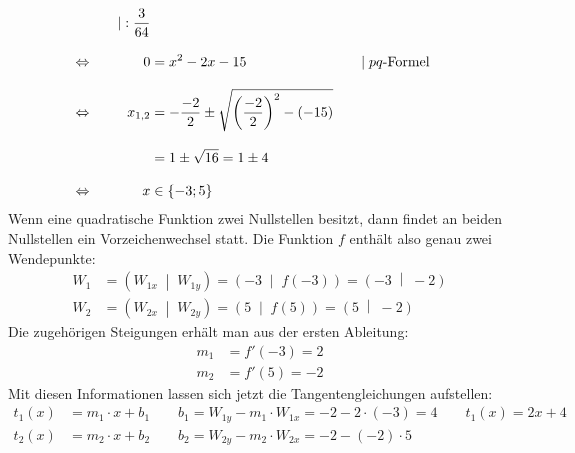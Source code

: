 \begin{exercise}
\begin{alignat*}{3}
      &
      \quad&|:\frac{3}{64}
      \\[2ex]
      \Leftrightarrow&\quad
      &
      0&=x^2-2x-15
      &
      \quad&|\;\text{$pq$-Formel}
      \\[2ex]
      \Leftrightarrow&\quad
      &
      x_{1,2}&=-\frac{-2}{2}\pm\sqrt{\left(\frac{-2}{2}\right)^2-(-15)}
      &
      \quad&\relax
      \\[2ex]
      \relax&\quad
      &
      &=1\pm\sqrt{16}=1\pm4
      &
      \quad&\relax
      \\[2ex]
      \Leftrightarrow&\quad
      &
      x&\in\{-3;5\}
      &
      \quad&\relax
    \end{alignat*}
    Wenn eine quadratische Funktion zwei
    Nullstellen besitzt, dann findet an beiden
    Nullstellen ein Vorzeichenwechsel statt.
    Die Funktion $f$ enthält also genau zwei
    Wendepunkte:
    \begin{equation*}
      \begin{split}
        W_1&=\left(W_{1x}\;\middle|\;W_{1y}\right)
            =\left(-3\;\middle|\;f(-3)\right)
            =\left(-3\;\middle|\;-2\right)
        \\
        W_2&=\left(W_{2x}\;\middle|\;W_{2y}\right)
            =\left(5\;\middle|\;f(5)\right)
            =\left(5\;\middle|\;-2\right)
      \end{split}
    \end{equation*}
    Die zugehörigen Steigungen erhält man aus der
    ersten Ableitung:
    \begin{equation*}
      \begin{split}
        m_1&=f'(-3)=2
        \\
        m_2&=f'(5)=-2
      \end{split}
    \end{equation*}
    Mit diesen Informationen lassen sich jetzt die
    Tangentengleichungen aufstellen:
    \begin{equation*}
      \begin{split}
        t_1(x)&=m_1\cdot x+b_1
        \qquad
        b_1=W_{1y}-m_1\cdot W_{1x}
           =-2-2\cdot(-3)
           =4
        \qquad
        t_1(x)=2x+4
        \\
        t_2(x)&=m_2\cdot x+b_2
        \qquad
        b_2=W_{2y}-m_2\cdot W_{2x}
           =-2-(-2)\cdot5

\end{split}
\end{equation*}
\end{exercise}
